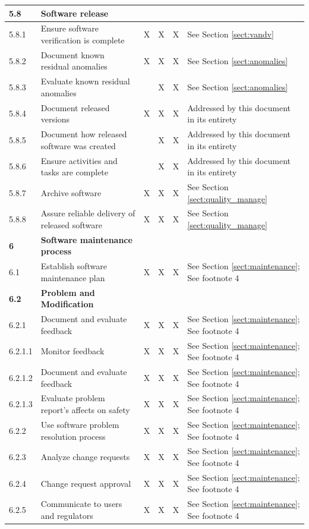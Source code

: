 \documentclass[]{article}
\begin{document}
\begin{center}
\begin{longtable}{ |p{1.3cm}| p{5.5cm}| p{0.7cm}| p{0.7cm}| p{0.7cm}| p{3.5cm}| }
	
	\rowcolor{blue!25} \textbf{5.8} & \textbf{Software release} &  &  &  &  \\ \hline
	5.8.1 & Ensure software verification is complete  & X & X & X & See Section \ref{sect:vandv} \\ \hline
	5.8.2 & Document known residual anomalies  & X & X & X & See Section \ref{sect:anomalies} \\ \hline
	5.8.3 & Evaluate known residual anomalies &  & X & X & See Section \ref{sect:anomalies} \\ \hline
	5.8.4 & Document released versions & X & X & X & Addressed by this document in its entirety \\ \hline
	5.8.5 & Document how released software was created  &  & X & X & Addressed by this document in its entirety \\ \hline
	5.8.6 & Ensure activities and tasks are complete  &  & X & X & Addressed by this document in its entirety \\ \hline
	5.8.7 & Archive software  & X & X & X & See Section \ref{sect:quality_manage} \\ \hline
	5.8.8 & Assure reliable delivery of released software & X & X & X & See Section \ref{sect:quality_manage} \\ \hline
	
	
	\rowcolor{blue!25} \textbf{6} & \textbf{Software maintenance process} &  &  &  &  \\ \hline
	6.1 & Establish software maintenance plan & X & X & X & See Section \ref{sect:maintenance}; See footnote 4 \\ \hline
	
	
	\rowcolor{blue!25} \textbf{6.2} & \textbf{Problem and Modification}  &  &  &  &  \\ \hline
	6.2.1 & Document and evaluate feedback  & X & X & X & See Section \ref{sect:maintenance}; See footnote 4 \\ \hline
	6.2.1.1 & Monitor feedback  & X & X & X & See Section \ref{sect:maintenance}; See footnote 4 \\ \hline
	6.2.1.2 & Document and evaluate feedback  & X & X & X & See Section \ref{sect:maintenance}; See footnote 4 \\ \hline
	6.2.1.3 & Evaluate problem report's affects on safety  & X & X & X & See Section \ref{sect:maintenance}; See footnote 4 \\ \hline
	6.2.2 & Use software problem resolution process  & X & X & X & See Section \ref{sect:maintenance}; See footnote 4 \\ \hline
	6.2.3 & Analyze change requests  & X & X & X & See Section \ref{sect:maintenance}; See footnote 4 \\ \hline
	6.2.4 & Change request approval  & X & X & X & See Section \ref{sect:maintenance}; See footnote 4 \\ \hline
	6.2.5 & Communicate to users and regulators  & X & X & X & See Section \ref{sect:maintenance}; See footnote 4 \\ \hline
	

\end{longtable}
\end{center}
\end{document}
